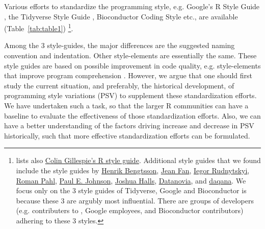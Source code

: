 Various efforts to standardize the programming style, e.g. Google's R Style Guide \citep{google}, the Tidyverse Style Guide \citep{tidyverse}, Bioconductor Coding Style \citep{bioconductor} etc.,  are available (Table~\ref{tab:table1}) \footnote{\citet{baaaath} lists also \href{https://csgillespie.wordpress.com/2010/11/23/r-style-guide/}{Colin Gillespie's R style guide}.  Additional style guides that we found include the style guides by \href{https://docs.google.com/document/d/1esDVxyWvH8AsX-VJa-8oqWaHLs4stGlIbk8kLc5VlII/edit}{Henrik Bengtsson}, \href{https://jef.works/R-style-guide/}{Jean Fan}, \href{https://irudnyts.github.io//r-coding-style-guide/}{Iegor Rudnytskyi}, \href{https://rpahl.github.io/r-some-blog/my-r-style-guide/}{Roman Pahl}, \href{https://cran.r-project.org/web/packages/rockchalk/vignettes/Rstyle.pdf}{Paul E. Johnson}, \href{https://bookdown.org/joshuah40/qa_code/Coding-Guidelines.html}{Joshua Halls},  \href{https://www.datanovia.com/en/blog/r-coding-style-best-practices/}{Datanovia}, and \href{https://www.daqana.org/dqstyle-r/}{daqana}. We focus only on the 3 style guides of Tidyverse, Google and Bioconductor is because these 3 are argubly most influential. There are groups of developers (e.g. contributers to , Google employees, and Bioconductor contributors) adhering to these 3 styles.}.

Among the 3 style-guides, the major differences are the suggested naming convention and indentation. Other style-elements are essentially the same. These style guides are based on possible improvement in code quality, e.g. style-elements that improve program comprehension \citep{oman}. However, we argue that one should first study the current situation, and preferably, the historical development, of programming style variations (PSV) to supplement these standardization efforts. We have undertaken such a task, so that the larger R communities can have a baseline to evaluate the effectiveness of those standardization efforts. Also, we can have a better understanding of the factors driving increase and decrease in PSV historically, such that more effective standardization efforts can be formulated.


